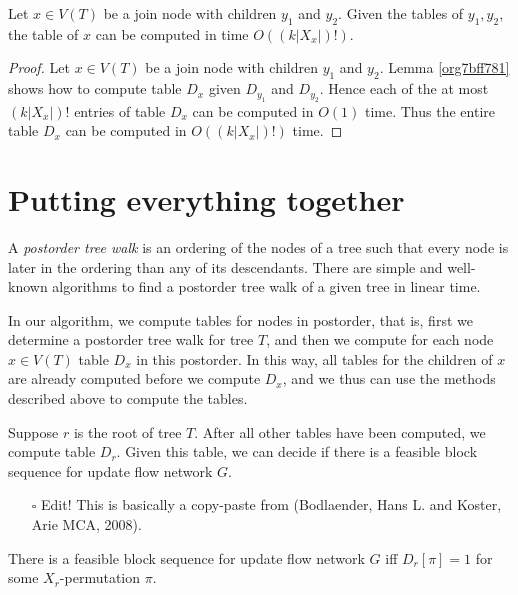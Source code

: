 \documentclass[fontsize=11pt,paper=a4]{book}
\begin{document}
\begin{lem}
Let \(x\in V(T)\) be a join node with children \(y_1\) and \(y_2\).
Given the tables of \(y_1,y_2\), the table of \(x\) can be computed in time \(O((k\lvert X_x\rvert)!)\).
\label{org83633f8}
\end{lem}

\begin{proof}
Let \(x\in V(T)\) be a join node with children \(y_1\) and \(y_2\).
Lemma \ref{org7bff781} shows how to compute table \(D_x\) given \(D_{y_1}\) and \(D_{y_2}\).
Hence each of the at most \((k\lvert X_x\rvert)!\) entries of table \(D_x\) can be computed in \(O(1)\) time.
Thus the entire table \(D_x\) can be computed in \(O((k\lvert X_x\rvert)!)\) time.
\end{proof}

\section{Putting everything together}
\label{sec:orgca26e40}

A \emph{postorder tree walk} is an ordering of the nodes of a tree such that every node is later in the ordering than any of its descendants.
There are simple and well-known algorithms to find a postorder tree walk of a given tree in linear time.

In our algorithm, we compute tables for nodes in postorder, that is, first we determine a postorder tree walk for tree \(T\), and then we compute for each node \(x\in V(T)\) table \(D_x\) in this postorder.
In this way, all tables for the children of \(x\) are already computed before we compute \(D_x\), and we thus can use the methods described above to compute the tables.

Suppose \(r\) is the root of tree \(T\).
After all other tables have been computed, we compute table \(D_r\).
Given this table, we can decide if there is a feasible block sequence for update flow network \(G\).

\begin{itemize}
\item[{$\square$}] Edit! This is basically a copy-paste from (Bodlaender, Hans L. and Koster, Arie MCA, 2008).
\end{itemize}

\begin{lem}
There is a feasible block sequence for update flow network \(G\) iff \(D_r[\pi]=1\) for some \(X_r\)-permutation \(\pi\).
\label{orgcbffb0f}
\end{lem}
\end{document}
